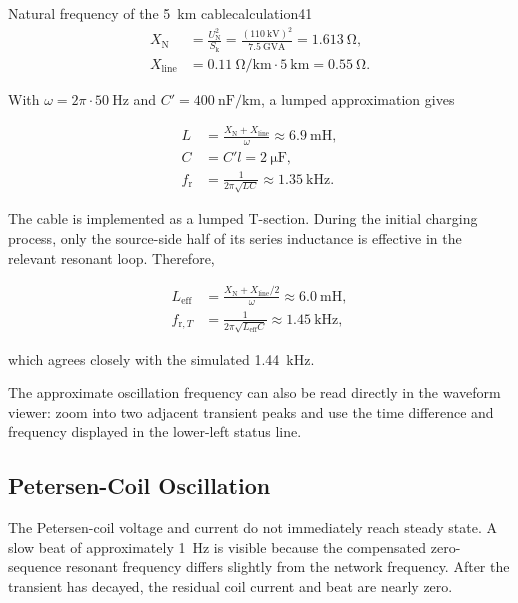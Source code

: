 \begin{calculation}{Natural frequency of the \SI{5}{\kilo\metre} cable}{calculation41}
\begin{align}
X_{\mathrm N}
  &=\frac{U_{\mathrm N}^2}{S_{\mathrm k}}
    =\frac{(\SI{110}{\kilo\volt})^2}
           {\SI{7.5}{\giga\volt\ampere}}
    =\SI{1.613}{\ohm},\\
X_{\mathrm{line}}
  &=\SI{0.11}{\ohm\per\kilo\metre}\cdot\SI{5}{\kilo\metre}
    =\SI{0.55}{\ohm}.
\end{align}

With $\omega=2\pi\cdot\SI{50}{\hertz}$ and
$C'=\SI{400}{\nano\farad\per\kilo\metre}$, a lumped approximation gives

\begin{align}
L&=\frac{X_{\mathrm N}+X_{\mathrm{line}}}{\omega}
  \approx\SI{6.9}{\milli\henry},\\
C&=C'l=\SI{2}{\micro\farad},\\
f_{\mathrm r}&=\frac{1}{2\pi\sqrt{LC}}
  \approx\SI{1.35}{\kilo\hertz}.
\end{align}

The cable is implemented as a lumped T-section. During the initial charging
process, only the source-side half of its series inductance is effective in the
relevant resonant loop. Therefore,

\begin{align}
L_{\mathrm{eff}}
 &=\frac{X_{\mathrm N}+X_{\mathrm{line}}/2}{\omega}
   \approx\SI{6.0}{\milli\henry},\\
f_{\mathrm r,T}
 &=\frac{1}{2\pi\sqrt{L_{\mathrm{eff}}C}}
   \approx\boxed{\SI{1.45}{\kilo\hertz}},
\end{align}

which agrees closely with the simulated \SI{1.44}{\kilo\hertz}.
\end{calculation}

The approximate oscillation frequency can also be read directly in the waveform viewer:
zoom into two adjacent transient peaks and use the time difference and
frequency displayed in the lower-left status line.

\subsection{Petersen-Coil Oscillation}
\label{sec:petersen-oscillation}

The Petersen-coil voltage and current do not immediately reach steady state.
A slow beat of approximately \SI{1}{\hertz} is visible because the compensated
zero-sequence resonant frequency differs slightly from the network frequency.
After the transient has decayed, the residual coil current and beat are nearly
zero.

